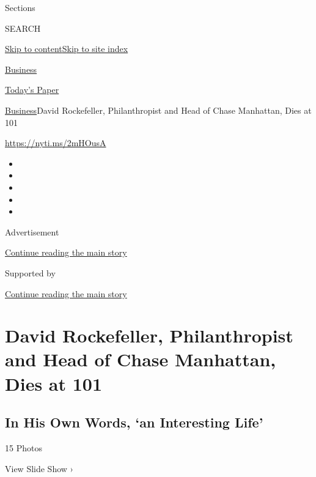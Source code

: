 Sections

SEARCH

\protect\hyperlink{site-content}{Skip to
content}\protect\hyperlink{site-index}{Skip to site index}

\href{https://www.nytimes3xbfgragh.onion/section/business}{Business}

\href{https://myaccount.nytimes3xbfgragh.onion/auth/login?response_type=cookie\&client_id=vi}{}

\href{https://www.nytimes3xbfgragh.onion/section/todayspaper}{Today's
Paper}

\href{/section/business}{Business}\textbar{}David Rockefeller,
Philanthropist and Head of Chase Manhattan, Dies at 101

\url{https://nyti.ms/2mHOusA}

\begin{itemize}
\item
\item
\item
\item
\item
\end{itemize}

Advertisement

\protect\hyperlink{after-top}{Continue reading the main story}

Supported by

\protect\hyperlink{after-sponsor}{Continue reading the main story}

\hypertarget{david-rockefeller-philanthropist-and-head-of-chase-manhattan-dies-at-101}{%
\section{David Rockefeller, Philanthropist and Head of Chase Manhattan,
Dies at
101}\label{david-rockefeller-philanthropist-and-head-of-chase-manhattan-dies-at-101}}

\href{https://www.nytimes3xbfgragh.onion/slideshow/2017/03/20/business/in-his-own-words-an-interesting-life.html}{}

\hypertarget{in-his-own-words-an-interesting-life}{%
\subsection{In His Own Words, `an Interesting
Life'}\label{in-his-own-words-an-interesting-life}}

15 Photos

View Slide Show ›

